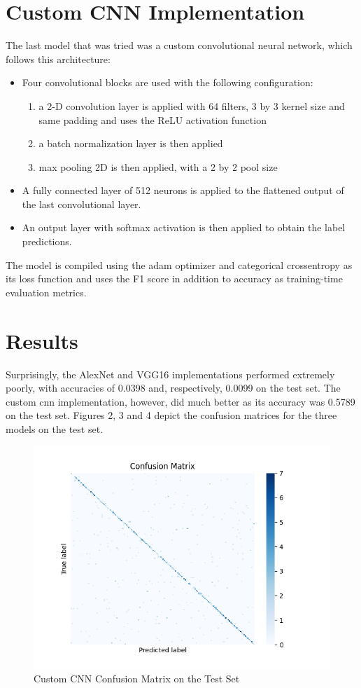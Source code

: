 \documentclass{article}
\begin{document}
\section{Custom CNN Implementation}
The last model that was tried was a custom convolutional neural network, which follows this architecture:
\begin{itemize}
\item Four convolutional blocks are used with the following configuration: 
\begin{enumerate}
\item a 2-D convolution layer is applied with 64 filters, 3 by 3 kernel size and same padding and uses the ReLU activation function
\item a batch normalization layer is then applied
\item max pooling 2D is then applied, with a 2 by 2 pool size
\end{enumerate}
\item A fully connected layer of 512 neurons is applied to the flattened output of the last convolutional layer.

\item An output layer with softmax activation is then applied to obtain the label predictions.
\end{itemize}
The model is compiled using the adam optimizer and categorical crossentropy as its loss function and uses the F1 score in addition to accuracy as training-time evaluation metrics.

\section{Results}
Surprisingly, the AlexNet and VGG16 implementations performed extremely poorly, with accuracies of 0.0398 and, respectively, 0.0099 on the test set. The custom cnn implementation, however, did much better as its accuracy was 0.5789 on the test set. Figures 2, 3 and 4 depict the confusion matrices for the three models on the test set.

\begin{figure}[hbt!]
	\centering
	\includegraphics[scale=0.58]{../conf_matrices/cnn_conf_matrix.png}
	\caption{Custom CNN Confusion Matrix on the Test Set}
\end{figure}
\end{document}
